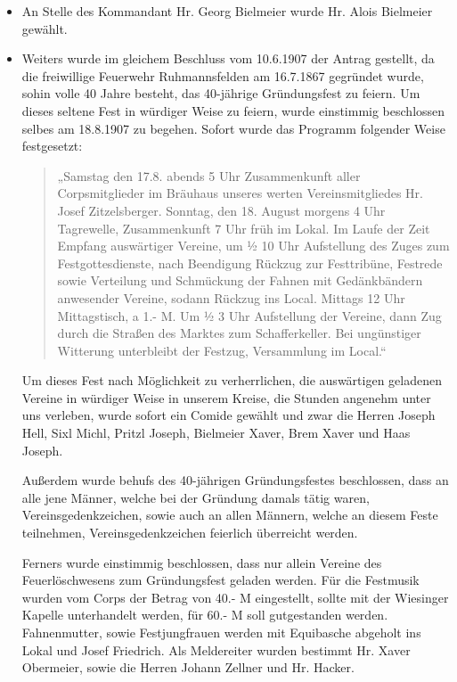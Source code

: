 \documentclass[12pt,a4paper]{book}
\begin{document}
\begin{itemize}
\item An Stelle des Kommandant Hr. Georg Bielmeier wurde Hr. Alois
Bielmeier gewählt.

\item Weiters wurde im gleichem Beschluss vom 10.6.1907 der Antrag
gestellt, da die freiwillige Feuerwehr Ruhmannsfelden am 16.7.1867
gegründet wurde, sohin volle 40 Jahre besteht, das 40-jährige
Gründungsfest zu feiern. Um dieses seltene Fest in würdiger Weise zu
feiern, wurde einstimmig beschlossen selbes am 18.8.1907 zu begehen.
Sofort wurde das Programm folgender Weise festgesetzt:

\begin{quote}
„Samstag den 17.8. abends 5 Uhr Zusammenkunft aller Corpsmitglieder im
Bräuhaus unseres werten Vereinsmitgliedes Hr. Josef Zitzelsberger.
Sonntag, den 18. August morgens 4 Uhr Tagrewelle, Zusammenkunft 7 Uhr
früh im Lokal. Im Laufe der Zeit Empfang auswärtiger Vereine, um ½ 10
Uhr Aufstellung des Zuges zum Festgottesdienste, nach Beendigung Rückzug
zur Festtribüne, Festrede sowie Verteilung und Schmückung der Fahnen mit
Gedänkbändern anwesender Vereine, sodann Rückzug ins Local. Mittags 12
Uhr Mittagstisch, a 1.- M. Um ½ 3 Uhr Aufstellung der Vereine, dann Zug
durch die Straßen des Marktes zum Schafferkeller. Bei ungünstiger
Witterung unterbleibt der Festzug, Versammlung im Local.“
\end{quote}

Um dieses Fest nach Möglichkeit zu verherrlichen, die auswärtigen
geladenen Vereine in würdiger Weise in unserem Kreise, die Stunden
angenehm unter uns verleben, wurde sofort ein Comide gewählt und zwar
die Herren Joseph Hell, Sixl Michl, Pritzl Joseph, Bielmeier Xaver, Brem
Xaver und Haas Joseph.

Außerdem wurde behufs des 40-jährigen Gründungsfestes beschlossen, dass
an alle jene Männer, welche bei der Gründung damals tätig waren,
Vereinsgedenkzeichen, sowie auch an allen Männern, welche an diesem
Feste teilnehmen, Vereinsgedenkzeichen feierlich überreicht werden.

Ferners wurde einstimmig beschlossen, dass nur allein Vereine des
Feuerlöschwesens zum Gründungsfest geladen werden. Für die Festmusik
wurden vom Corps der Betrag von 40.- M eingestellt, sollte mit der
Wiesinger Kapelle unterhandelt werden, für 60.- M soll gutgestanden
werden. Fahnenmutter, sowie Festjungfrauen werden mit Equibasche
abgeholt ins Lokal und Josef Friedrich. Als Meldereiter wurden bestimmt
Hr. Xaver Obermeier, sowie die Herren Johann Zellner und Hr. Hacker.


\end{itemize}
\end{document}
